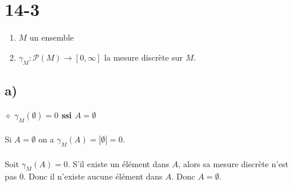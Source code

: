 \documentclass[a4paper,10pt]{article}
\begin{document}
\section*{14-3}
\begin{enumerate}
	\item $M$ un ensemble
	\item $\gamma_M : \mathcal{P}(M) \rightarrow [0, \infty]$ la mesure discrète sur $M$. 
\end{enumerate}
\subsection*{a)}
$\diamond$ \textbf{$\gamma_M (\emptyset) = 0$ ssi $A = \emptyset$}
\\
\\
Si $A = \emptyset$ on a $\gamma_M (A) = |\emptyset| = 0$.
\\
\\
Soit $\gamma_M (A) = 0$. S'il existe un élément dans $A$, alors sa mesure discrète n'est pas 0. Donc il n'existe aucune élément dans $A$. Donc $A = \emptyset$.
\end{document}
